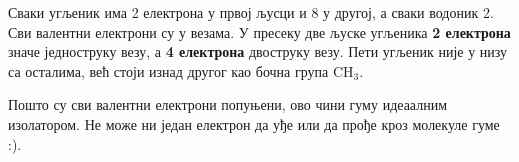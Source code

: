 \documentclass{article}
\begin{document}
Сваки угљеник има 2 електрона у првој љусци и 8 у другој, а сваки водоник 2. Сви валентни електрони су у везама. У пресеку две љуске угљеника \textbf{2 електрона} значе једноструку везу, а \textbf{4 електрона} двоструку везу. Пети угљеник није у низу са осталима, већ стоји изнад другог као бочна група $\mathrm{CH_3}$.

Пошто су сви валентни електрони попуњени, ово чини гуму идеаалним изолатором. Не може ни један електрон да уђе или да прође кроз молекуле гуме :).
\end{document}

